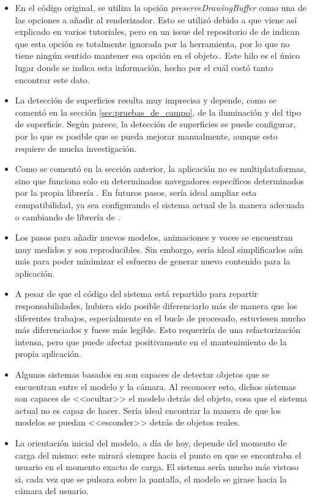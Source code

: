 \documentclass{subfiles}
\begin{document}
    \begin{itemize}
        \item En el código original, se utiliza la opción \textit{preserveDrawingBuffer} como una de las opciones a añadir al renderizador. Esto se utilizó debido a que viene así explicado en varios tutoriales, pero en un issue del repositorio de \github de \webxr indican que esta opción es totalmente ignorada por la herramienta, por lo que no tiene ningún sentido mantener esa opción en el objeto.\cite{web:webxr_github_preserveDrawingBuffer}. Este hilo es el único lugar donde se indica esta información, hecho por el cuál costó tanto encontrar este dato.
        \item La detección de superficies resulta muy imprecisa y depende, como se comentó en la sección \ref{sec:pruebas_de_campo}, de la iluminación y del tipo de superficie. Según parece, la detección de superficies se puede configurar, por lo que es posible que se pueda mejorar manualmente, aunque esto requiere de mucha investigación.
        \item Como se comentó en la sección anterior, la aplicación no es multiplataformas, sino que funciona solo en determinados navegadores específicos determinados por la propia librería \webxr. En futuros pasos, sería ideal ampliar esta compatibilidad, ya sea configurando el sistema actual de la manera adecuada o cambiando de librería de \ra.
        \item Los pasos para añadir nuevos modelos, animaciones y voces se encuentran muy medidos y son reproducibles. Sin embargo, sería ideal simplificarlos aún más para poder minimizar el esfuerzo de generar nuevo contenido para la aplicación.
        \item A pesar de que el código del sistema está repartido para repartir responsabilidades, hubiera sido posible diferenciarlo más de manera que los diferentes trabajos, especialmente en el bucle de procesado, estuviesen mucho más diferenciados y fuese más legible. Esto requeriría de una refactorización intensa, pero que puede afectar positivamente en el mantenimiento de la propia aplicación.
        \item Algunos sistemas basados en \webxr son capaces de detectar objetos que se encuentran entre el modelo y la cámara. Al reconocer esto, dichos sistemas son capaces de <<ocultar>> el modelo detrás del objeto, cosa que el sistema actual no es capaz de hacer. Sería ideal encontrar la manera de que los modelos se puedan <<esconder>> detrás de objetos reales.
        \item La orientación inicial del modelo, a día de hoy, depende del momento de carga del mismo: este mirará siempre hacia el punto en que se encontraba el usuario en el momento exacto de carga. El sistema sería mucho más vistoso si, cada vez que se pulsara sobre la pantalla, el modelo se girase hacia la cámara del usuario.

\end{itemize}
\end{document}
